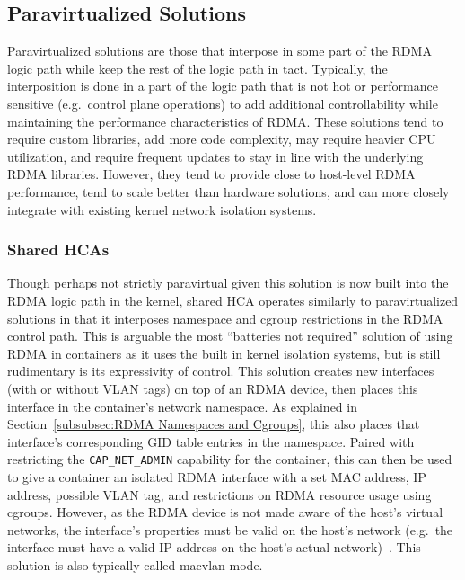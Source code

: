 \documentclass[12pt,titlepage]{article}
\begin{document}
\subsection{Paravirtualized Solutions}
Paravirtualized solutions are those that interpose in some part of the RDMA logic path while keep the rest of the logic path in tact.
Typically, the interposition is done in a part of the logic path that is not hot or performance sensitive (e.g.\ control plane operations) to add additional controllability while maintaining the performance characteristics of RDMA\@.
These solutions tend to require custom libraries, add more code complexity, may require heavier CPU utilization, and require frequent updates to stay in line with the underlying RDMA libraries.
However, they tend to provide close to host-level RDMA performance, tend to scale better than hardware solutions, and can more closely integrate with existing kernel network isolation systems.

%

\subsubsection{Shared HCAs}
Though perhaps not strictly paravirtual given this solution is now built into the RDMA logic path in the kernel, shared HCA operates similarly to paravirtualized solutions in that it interposes namespace and cgroup restrictions in the RDMA control path.
This is arguable the most ``batteries not required'' solution of using RDMA in containers as it uses the built in kernel isolation systems, but is still rudimentary is its expressivity of control.
This solution creates new interfaces (with or without VLAN tags) on top of an RDMA device, then places this interface in the container's network namespace.
As explained in Section~\ref{subsubsec:RDMA Namespaces and Cgroups}, this also places that interface's corresponding GID table entries in the namespace.
Paired with restricting the \texttt{CAP\_NET\_ADMIN} capability for the container, this can then be used to give a container an isolated RDMA interface with a set MAC address, IP address, possible VLAN tag, and restrictions on RDMA resource usage using cgroups.
However, as the RDMA device is not made aware of the host's virtual networks, the interface's properties must be valid on the host's network (e.g.\ the interface must have a valid IP address on the host's actual network)~\cite{mellanoxdockermacvlan,dockermacvlan}.
This solution is also typically called macvlan mode.
\end{document}
